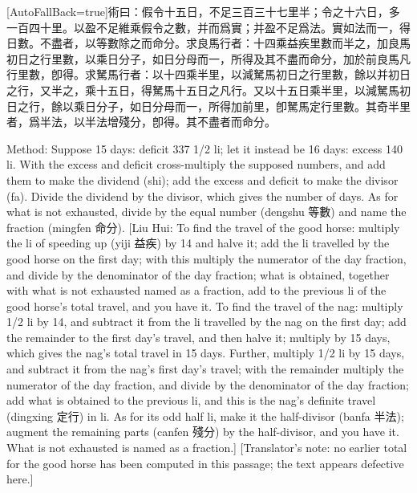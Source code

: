 \documentclass[11pt]{article}
\newcommand{\zhsmall}{\footnotesize\color{black!70}}
\newcommand{\unitlabel}[1]{\marginpar{\raggedleft\tiny\color{gray}#1}}
\newenvironment{unitzh}{\par\CJKfontspec{Noto Serif CJK SC}[AutoFallBack=true]\large\linespread{1.25}\selectfont}{\par}
\newenvironment{uniten}{\par\small\color{black!85}}{\par\medskip}
\begin{document}
\begin{unitzh}\unitlabel{jiuzhang-031.7}術曰：假令十五日，不足三百三十七里半；令之十六日，多一百四十里。以盈不足維乘假令之數，并而爲實；并盈不足爲法。實如法而一，得日數。不盡者，以等數除之而命分。{\zhsmall 求良馬行者：十四乘益疾里數而半之，加良馬初日之行里數，以乘日分子，如日分母而一，所得及其不盡而命分，加於前良馬凡行里數，卽得。求駑馬行者：以十四乘半里，以減駑馬初日之行里數，餘以并初日之行，又半之，乘十五日，得駑馬十五日之凡行。又以十五日乘半里，以減駑馬初日之行，餘以乘日分子，如日分母而一，所得加前里，卽駑馬定行里數。其奇半里者，爲半法，以半法增殘分，卽得。其不盡者而命分。}\end{unitzh}
\begin{uniten}Method: Suppose 15 days: deficit 337 1/2 li; let it instead be 16 days: excess 140 li. With the excess and deficit cross-multiply the supposed numbers, and add them to make the dividend (shi); add the excess and deficit to make the divisor (fa). Divide the dividend by the divisor, which gives the number of days. As for what is not exhausted, divide by the equal number (dengshu 等數) and name the fraction (mingfen 命分). [Liu Hui: To find the travel of the good horse: multiply the li of speeding up (yiji 益疾) by 14 and halve it; add the li travelled by the good horse on the first day; with this multiply the numerator of the day fraction, and divide by the denominator of the day fraction; what is obtained, together with what is not exhausted named as a fraction, add to the previous li of the good horse's total travel, and you have it. To find the travel of the nag: multiply 1/2 li by 14, and subtract it from the li travelled by the nag on the first day; add the remainder to the first day's travel, and then halve it; multiply by 15 days, which gives the nag's total travel in 15 days. Further, multiply 1/2 li by 15 days, and subtract it from the nag's first day's travel; with the remainder multiply the numerator of the day fraction, and divide by the denominator of the day fraction; add what is obtained to the previous li, and this is the nag's definite travel (dingxing 定行) in li. As for its odd half li, make it the half-divisor (banfa 半法); augment the remaining parts (canfen 殘分) by the half-divisor, and you have it. What is not exhausted is named as a fraction.] [Translator's note: no earlier total for the good horse has been computed in this passage; the text appears defective here.]\end{uniten}
\end{document}
